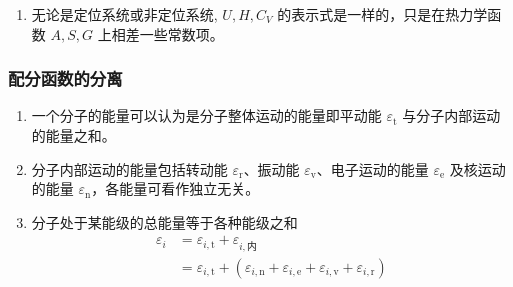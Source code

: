 \begin{enumerate}
    \item 无论是定位系统或非定位系统, $U, H, C_V$ 的表示式是一样的，只是在热力学函数 $A, S, G$ 上相差一些常数项。
\end{enumerate}

\subsubsection{配分函数的分离}

\begin{enumerate}
    \item 一个分子的能量可以认为是分子整体运动的能量即平动能 $\varepsilon_{\mathrm{t}}$ 与分子内部运动的能量之和。
    \item 分子内部运动的能量包括转动能 $\varepsilon_{\mathrm{r}}$、振动能 $\varepsilon_{\mathrm{v}}$、电子运动的能量 $\varepsilon_{\mathrm{e}}$ 及核运动的能量 $\varepsilon_{\mathrm{n}}$，各能量可看作独立无关。
    \item 分子处于某能级的总能量等于各种能级之和
    \begin{equation}
        \begin{aligned}
            \varepsilon_i &= \varepsilon_{i,\mathrm{t}} + \varepsilon_{i,\text{内}} \\
            &= \varepsilon_{i,\mathrm{t}} + (\varepsilon_{i,\mathrm{n}} + \varepsilon_{i,\mathrm{e}} + \varepsilon_{i,\mathrm{v}} + \varepsilon_{i,\mathrm{r}}) \\
        \end{aligned}
    \end{equation}


\end{enumerate}
